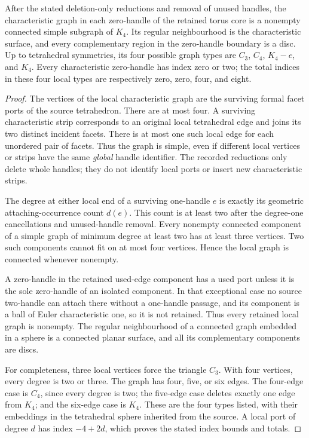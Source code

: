 \begin{lemma}
\label{lem:unused-k4}
After the stated deletion-only reductions and removal of unused handles,
the characteristic graph in each zero-handle of the retained torus core is
a nonempty connected simple subgraph of $K_4$.  Its regular neighbourhood
is the characteristic surface, and every complementary region in the
zero-handle boundary is a disc.  Up to tetrahedral symmetries, its four
possible graph types are $C_3$, $C_4$, $K_4-e$, and $K_4$.  Every
characteristic zero-handle has index zero or two; the total indices in
these four local types are respectively zero, zero, four, and eight.
\end{lemma}
\begin{proof}
The vertices of the local characteristic graph are the surviving formal
facet ports of the source tetrahedron.  There are at most four.  A surviving
characteristic strip corresponds to an original local tetrahedral edge
and joins its two distinct incident facets.  There is at most one such
local edge for each unordered pair of facets.  Thus the graph is simple,
even if different local vertices or strips have the same \emph{global}
handle identifier.  The recorded reductions only delete whole handles;
they do not identify local ports or insert new characteristic strips.

The degree at either local end of a surviving one-handle $e$ is exactly
its geometric attaching-occurrence count $d(e)$.  This count is at least
two after the degree-one cancellations and unused-handle removal.  Every
nonempty connected component of a simple graph of minimum degree at least
two has at least three vertices.  Two such components cannot fit on at
most four vertices.  Hence the local graph is connected whenever nonempty.

A zero-handle in the retained used-edge component has a used port unless
it is the sole zero-handle of an isolated component.  In that exceptional
case no source two-handle can attach there without a one-handle passage,
and its component is a ball of Euler characteristic one, so it is not
retained.  Thus every retained local graph is nonempty.  The regular
neighbourhood of a connected graph embedded in a sphere is a connected
planar surface, and all its complementary components are discs.

For completeness, three local vertices force the triangle $C_3$.  With
four vertices, every degree is two or three.  The graph has four, five,
or six edges.  The four-edge case is $C_4$, since every degree is two;
the five-edge case deletes exactly one edge from $K_4$; and the six-edge
case is $K_4$.  These are the four types listed, with their embeddings
in the tetrahedral sphere inherited from the source.  A local port of
degree $d$ has index $-4+2d$, which proves the stated index bounds and
totals.
\end{proof}

